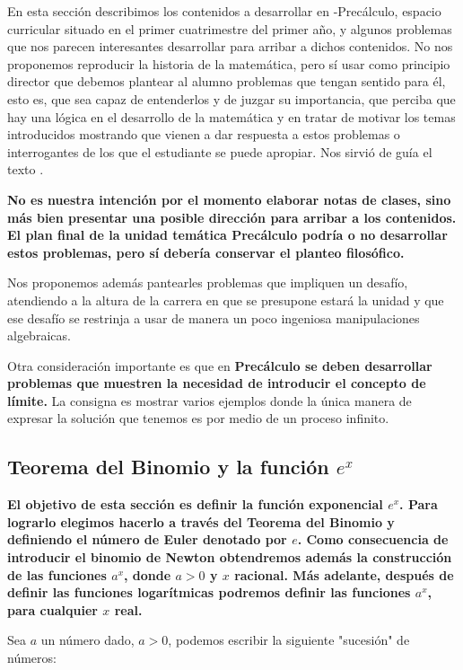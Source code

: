 \documentclass[a4paper,10pt,BCOR10mm,oneside,headsepline]{scrbook}
\begin{document}
En esta sección describimos los contenidos a desarrollar en -Precálculo, espacio curricular situado en el primer cuatrimestre del primer año, y algunos problemas que nos parecen interesantes desarrollar para arribar a dichos contenidos. 
No nos proponemos reproducir la historia de la matemática, pero sí usar como principio director que debemos plantear al alumno problemas que tengan sentido para él, esto es, que sea capaz de entenderlos y de juzgar su importancia, que perciba que hay una lógica en el desarrollo de la matemática y en tratar de motivar los temas introducidos mostrando que vienen a dar respuesta a estos problemas o interrogantes de los que el estudiante se puede apropiar. Nos sirvió de  guía el texto \cite{hairer_history}. 

\textbf{No es nuestra intención por el momento elaborar notas de clases, sino más bien presentar una posible dirección para arribar a los contenidos. El plan final de la unidad temática Precálculo podría o no desarrollar estos problemas, pero sí debería conservar el planteo filosófico.}  

Nos proponemos además pantearles problemas que impliquen un desafío, atendiendo a la altura de la carrera en que 
se presupone estará la unidad y que ese desafío se restrinja a usar de manera un  poco ingeniosa  manipulaciones algebraicas.

Otra consideración importante es que en \textbf{Precálculo se deben desarrollar problemas que muestren la necesidad de introducir el concepto de límite.} La consigna es mostrar varios ejemplos donde la única manera de expresar la solución que tenemos es por medio de un proceso infinito.






\subsection{Teorema del Binomio y la función $e^x$}

\textbf{El objetivo de esta sección es definir la función exponencial $e^x$. Para lograrlo elegimos hacerlo a través del Teorema del Binomio y definiendo el número de Euler denotado por $e$. Como consecuencia de introducir el binomio de Newton obtendremos además la construcción de las funciones $a^x$, donde $a>0$ y $x$ racional. Más adelante, después de definir las funciones logarítmicas podremos definir las funciones $a^x$, para cualquier $x$ real.}

Sea $a$ un número dado, $a>0$, podemos escribir la siguiente "sucesión" de números: 
\end{document}
